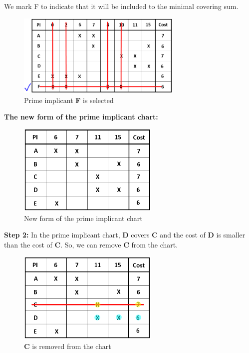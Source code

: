 \documentclass[pdftex,12pt,a4paper]{article}
\begin{document}
\begin{enumerate}[label=\alph*)]
   We mark F to indicate that it will be included to the minimal covering sum.
   \begin{figure}[H]
    \centering
        \includegraphics[width=0.7\textwidth]{chart2.png}	
        \caption{Prime implicant \textbf{F} is selected}
        \label{fig1}
   \end{figure}

   \textbf{The new form of the prime implicant chart:}
   \begin{figure}[H]
    \centering
        \includegraphics[width=0.6\textwidth]{chart3.png}	
        \caption{New form of the prime implicant chart}
        \label{fig1}
   \end{figure}

   \textbf{Step 2:} In the prime implicant chart, \textbf{D} covers \textbf{C} and the cost of \textbf{D} is smaller than the cost of \textbf{C}. So, we can remove \textbf{C} from the chart.

   \begin{figure}[H]
    \centering
        \includegraphics[width=0.6\textwidth]{chart4.png}	
        \caption{\textbf{C} is removed from the chart}
        \label{fig1}
   \end{figure}
    

\end{enumerate}
\end{document}
